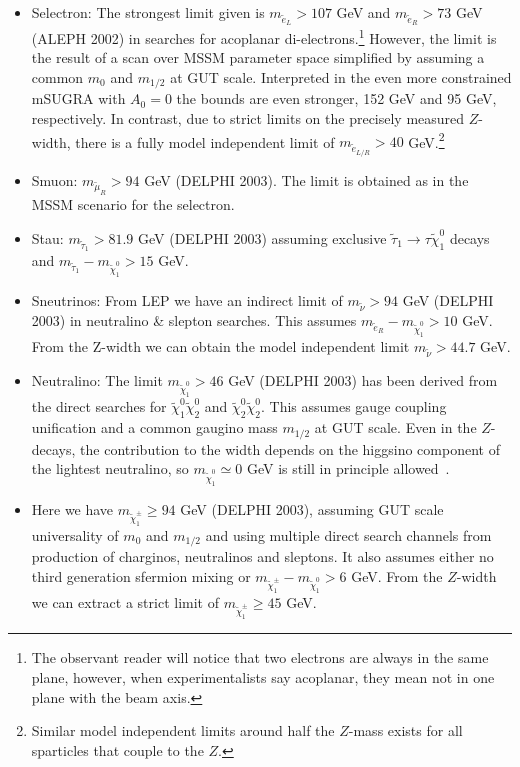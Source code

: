\documentclass[notes.tex]{subfiles}
\begin{document}
\begin{itemize}
\item Selectron: The strongest limit given is $m_{\tilde{e}_L}>107$ GeV and $m_{\tilde{e}_R}>73$ GeV (ALEPH 2002) in searches for acoplanar di-electrons.\footnote{The observant reader will notice that two electrons are always in the same plane, however, when experimentalists say acoplanar, they mean not in one plane with the beam axis.} However, the limit is the result of a scan over MSSM parameter space simplified by assuming a common $m_0$ and $m_{1/2}$ at GUT scale. Interpreted in the even more constrained mSUGRA with $A_0=0$ the bounds are even stronger, 152 GeV and 95 GeV, respectively. In contrast, due to strict limits on the precisely measured $Z$-width, there is a fully model independent limit of $m_{\tilde{e}_{L/R}}>40$ GeV.\footnote{Similar model independent limits around half the $Z$-mass exists for all sparticles that couple to the $Z$.}
\item Smuon: $m_{\tilde{\mu}_R}>94$ GeV (DELPHI 2003). The limit is obtained as in the MSSM scenario for the selectron.
\item Stau: $m_{\tilde{\tau}_1}>81.9$ GeV (DELPHI 2003) assuming exclusive $\tilde{\tau}_1 \to \tau \tilde{\chi}^0_1$ decays and $m_{\tilde{\tau}_1} - m_{\tilde{\chi}^0_1}> 15$ GeV.
\item Sneutrinos: From  LEP we have an indirect limit of  $m_{\tilde{\nu}}>94$ GeV (DELPHI 2003) in neutralino \& slepton searches. This assumes $m_{\tilde{e}_R} - m_{\tilde{\chi}^0_1}>10$ GeV. From the Z-width we can obtain the model independent limit $m_{\tilde{\nu}}> 44.7$ GeV. 
\item Neutralino: The limit $m_{\tilde{\chi}^0_1}> 46$ GeV (DELPHI 2003) has been derived from the direct searches for $\tilde{\chi}^0_1 \tilde{\chi}^0_2$ and $\tilde{\chi}^0_2 \tilde{\chi}^0_2$. This assumes gauge coupling unification and a common gaugino mass $m_{1/2}$ at GUT scale. Even in the $Z$-decays, the contribution to the width depends on the higgsino component of the lightest neutralino, so $m_{\tilde{\chi}^0_1} \simeq 0$ GeV is still in principle allowed~\cite{Dreiner:2009ic}.
\item Here we have $m_{\tilde{\chi}^\pm_1}\geq 94$ GeV (DELPHI 2003), assuming GUT scale universality of $m_0$ and $m_{1/2}$ and using multiple direct search channels from production of charginos, neutralinos and sleptons. It also assumes either no third generation sfermion mixing or $m_{\tilde{\chi}^\pm_1} - m_{\tilde{\chi}^0_1}>6$ GeV. From the $Z$-width we can extract a strict limit of $m_{\tilde{\chi}^\pm_1}\geq 45$ GeV.
\end{itemize}
\end{document}
